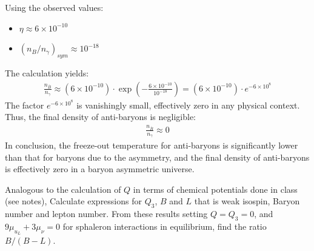 Using the observed values:
\begin{itemize}
    \item $\eta \approx 6 \times 10^{-10}$
    \item $(n_B/n_\gamma)_{sym} \approx 10^{-18}$
\end{itemize}

The calculation yields:
\begin{align}
    \frac{n_{\bar{B}}}{n_\gamma} \approx (6 \times 10^{-10}) \cdot \exp\left( - \frac{6 \times 10^{-10}}{10^{-18}} \right) = (6 \times 10^{-10}) \cdot e^{-6 \times 10^8}
\end{align}
The factor $e^{-6 \times 10^8}$ is vanishingly small, effectively zero in any physical context. Thus, the final density of anti-baryons is negligible:
\begin{align}
    \frac{n_{\bar{B}}}{n_\gamma} \approx 0
\end{align}
In conclusion, the freeze-out temperature for anti-baryons is significantly lower than that for baryons due to the asymmetry, and the final density of anti-baryons is effectively zero in a baryon asymmetric universe.



\clearpage
{}
Analogous to the calculation of $Q$ in terms of chemical potentials done in class (see notes), Calculate expressions for $Q_3$, $B$ and $L$ that is weak isospin, Baryon number and lepton number. From these results setting $Q=Q_3=0$, and $9\mu_{u_L}+3\mu_\nu=0$ for sphaleron interactions in equilibrium, find the ratio $B/(B-L)$.
\answer{} 

